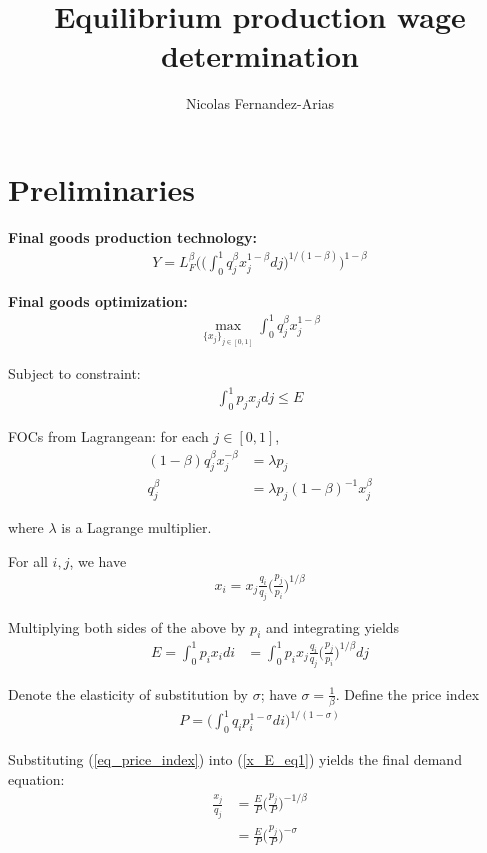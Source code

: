 \documentclass[12pt,english]{article}
\theoremstyle{remark}
\begin{document}
\title{Equilibrium production wage determination}
\author{Nicolas Fernandez-Arias}
\maketitle

\section{Preliminaries}
\textbf{Final goods production technology:}
\begin{align}
Y = L_F^{\beta}\Bigg( \Big(\int_0^1 q_j^{\beta} x_j^{1-\beta} dj \Big)^{1/(1-\beta)} \Bigg)^{1-\beta} \label{final_good_technology}
\end{align}

\textbf{Final goods optimization:}
\begin{align*}
\max_{\{x_j\}_{j\in [0,1]}} \int_0^1 q_j^{\beta} x_j^{1-\beta} 
\end{align*}

Subject to constraint:  
\begin{align*}
\int_0^1 p_j x_j dj \le E
\end{align*}

FOCs from Lagrangean: for each $j \in [0,1]$, 
\begin{align*}
(1-\beta)q_j^{\beta} x_j^{-\beta} &= \lambda p_j \\
					 q_j^{\beta}  &= \lambda p_j (1-\beta)^{-1} x_j^{\beta}
\end{align*}

where $\lambda$ is a Lagrange multiplier. 

For all $i,j$, we have 
\begin{align*}
x_i = x_j \frac{q_i}{q_j} \Big(\frac{p_j}{p_i}\Big)^{1/\beta}
\end{align*}

Multiplying both sides of the above by $p_i$ and integrating yields
\begin{align}
E = \int_0^1 p_i x_i di &= \int_0^1 p_i x_j \frac{q_i}{q_j} \Big(\frac{p_j}{p_i}\Big)^{1/\beta} dj \label{x_E_eq1}
\end{align}

Denote the elasticity of substitution by $\sigma$; have $\sigma = \frac{1}{\beta}$. Define the price index
\begin{align}
P = \Big(\int_0^1 q_i p_i^{1-\sigma} di \Big)^{1/(1-\sigma)} \label{eq_price_index}
\end{align}

Substituting (\ref{eq_price_index}) into (\ref{x_E_eq1}) yields the final demand equation:
\begin{align}
\frac{x_j}{q_j} &= \frac{E}{P} \Big(\frac{p_j}{P}\Big)^{-1/\beta} \label{eq_x_demand_betaversion} \\
			    &= \frac{E}{P} \Big(\frac{p_j}{P}\Big)^{-\sigma} \label{eq_x_demand}
\end{align}
\end{document}
